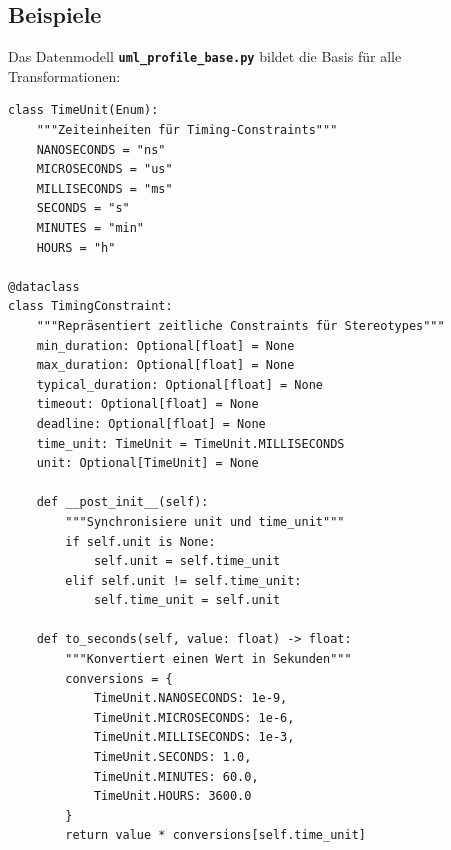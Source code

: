 ﻿\documentclass[a4paper,12pt]{scrreprt}
\theoremstyle{definition}
\begin{document}
\subsection{Beispiele}

Das Datenmodell \texttt{\textbf{uml\_profile\_base.py}} bildet die Basis für alle Transformationen:
\begin{lstlisting}[style=python, caption={TimingConstraint Klasse}, label={lst:timing-constraint}]
class TimeUnit(Enum):
    """Zeiteinheiten für Timing-Constraints"""
    NANOSECONDS = "ns"
    MICROSECONDS = "us"
    MILLISECONDS = "ms"
    SECONDS = "s"
    MINUTES = "min"
    HOURS = "h"

@dataclass
class TimingConstraint:
    """Repräsentiert zeitliche Constraints für Stereotypes"""
    min_duration: Optional[float] = None 
    max_duration: Optional[float] = None 
    typical_duration: Optional[float] = None 
    timeout: Optional[float] = None 
    deadline: Optional[float] = None 
    time_unit: TimeUnit = TimeUnit.MILLISECONDS
    unit: Optional[TimeUnit] = None 
    
    def __post_init__(self):
        """Synchronisiere unit und time_unit"""
        if self.unit is None:
            self.unit = self.time_unit
        elif self.unit != self.time_unit:
            self.time_unit = self.unit
    
    def to_seconds(self, value: float) -> float:
        """Konvertiert einen Wert in Sekunden"""
        conversions = {
            TimeUnit.NANOSECONDS: 1e-9,
            TimeUnit.MICROSECONDS: 1e-6,
            TimeUnit.MILLISECONDS: 1e-3,
            TimeUnit.SECONDS: 1.0,
            TimeUnit.MINUTES: 60.0,
            TimeUnit.HOURS: 3600.0
        }
        return value * conversions[self.time_unit]
\end{lstlisting}
\end{document}

